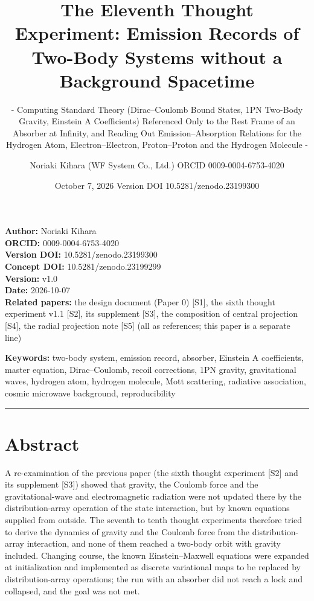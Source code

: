 \documentclass[
  a4paper,
]{article}
\title{The Eleventh Thought Experiment: Emission Records of Two-Body
Systems without a Background Spacetime}
\subtitle{- Computing Standard Theory (Dirac--Coulomb Bound States, 1PN
Two-Body Gravity, Einstein A Coefficients) Referenced Only to the Rest
Frame of an Absorber at Infinity, and Reading Out Emission--Absorption
Relations for the Hydrogen Atom, Electron--Electron, Proton--Proton and
the Hydrogen Molecule -}
\author{Noriaki Kihara (WF System Co., Ltd.) ORCID 0009-0004-6753-4020}
\date{October 7, 2026 Version DOI 10.5281/zenodo.23199300}
\newcounter{none} %
\begin{document}
\maketitle

\textbf{Author:} Noriaki Kihara\\
\textbf{ORCID:} 0009-0004-6753-4020\\
\textbf{Version DOI:} 10.5281/zenodo.23199300\\
\textbf{Concept DOI:} 10.5281/zenodo.23199299\\
\textbf{Version:} v1.0\\
\textbf{Date:} 2026-10-07\\
\textbf{Related papers:} the design document (Paper 0) {[}S1{]}, the
sixth thought experiment v1.1 {[}S2{]}, its supplement {[}S3{]}, the
composition of central projection {[}S4{]}, the radial projection note
{[}S5{]} (all as references; this paper is a separate line)

\textbf{Keywords:} two-body system, emission record, absorber, Einstein
A coefficients, master equation, Dirac--Coulomb, recoil corrections, 1PN
gravity, gravitational waves, hydrogen atom, hydrogen molecule, Mott
scattering, radiative association, cosmic microwave background,
reproducibility

\begin{center}\rule{0.5\linewidth}{0.5pt}\end{center}

\section{Abstract}\label{abstract}

A re-examination of the previous paper (the sixth thought experiment
{[}S2{]} and its supplement {[}S3{]}) showed that gravity, the Coulomb
force and the gravitational-wave and electromagnetic radiation were not
updated there by the distribution-array operation of the state
interaction, but by known equations supplied from outside. The seventh
to tenth thought experiments therefore tried to derive the dynamics of
gravity and the Coulomb force from the distribution-array interaction,
and none of them reached a two-body orbit with gravity included.
Changing course, the known Einstein--Maxwell equations were expanded at
initialization and implemented as discrete variational maps to be
replaced by distribution-array operations; the run with an absorber did
not reach a lock and collapsed, and the goal was not met.
\end{document}
